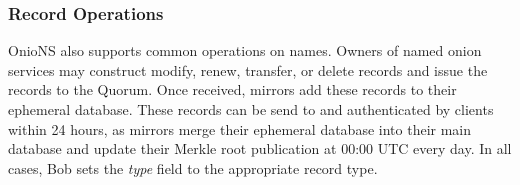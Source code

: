 \documentclass[USenglish,oneside,twocolumn]{article}
\begin{document}
%
%





\subsubsection{Record Operations}
\label{sec:recordOps}


OnioNS also supports common operations on names. Owners of named onion services may construct modify, renew, transfer, or delete records and issue the records to the Quorum. Once received, mirrors add these records to their ephemeral database. These records can be send to and authenticated by clients within 24 hours, as mirrors merge their ephemeral database into their main database and update their Merkle root publication at 00:00 UTC every day. In all cases, Bob sets the \emph{type} field to the appropriate record type.
\end{document}
